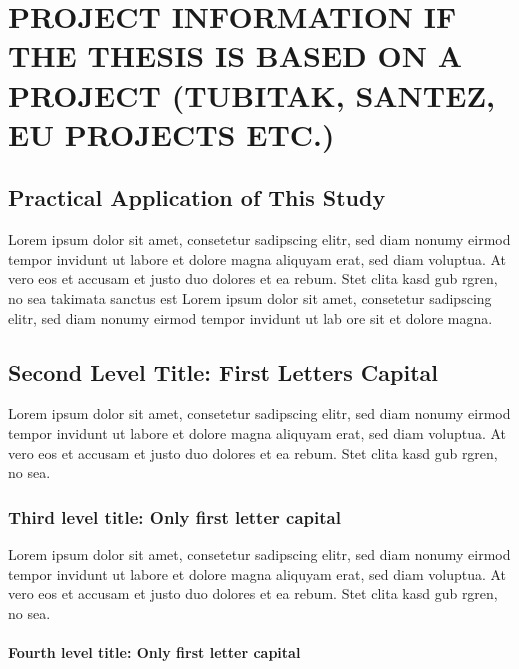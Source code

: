 \chapter{PROJECT INFORMATION IF THE THESIS IS BASED ON A PROJECT (TUBITAK, SANTEZ, EU PROJECTS ETC.)}\label{Ch8}
\vspace*{-12pt} %
\section{Practical Application of This Study}

Lorem ipsum dolor sit amet, consetetur sadipscing elitr, sed diam nonumy eirmod tempor invidunt ut labore et dolore magna aliquyam erat, sed diam voluptua. At vero eos et accusam et justo duo dolores et ea rebum. Stet clita kasd gub rgren, no sea takimata sanctus est Lorem ipsum dolor sit amet, consetetur sadipscing elitr, sed diam nonumy eirmod tempor invidunt ut lab ore sit et dolore magna.

\section{Second Level Title: First Letters Capital}

Lorem ipsum dolor sit amet, consetetur sadipscing elitr, sed diam nonumy eirmod tempor invidunt ut labore et dolore magna aliquyam erat, sed diam voluptua. At vero eos et accusam et justo duo dolores et ea rebum. Stet clita kasd gub rgren, no sea.

\subsection{Third level title: Only first letter capital}

Lorem ipsum dolor sit amet, consetetur sadipscing elitr, sed diam nonumy eirmod tempor invidunt ut labore et dolore magna aliquyam erat, sed diam voluptua. At vero eos et accusam et justo duo dolores et ea rebum. Stet clita kasd gub rgren, no sea.

\subsubsection{Fourth level title: Only first letter capital}

